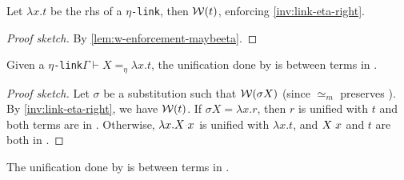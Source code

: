 \documentclass[sigconf,natbib=false,review]{acmart}
\newcommand{\appsep}{\ensuremath{\textcolor{lightgray}{\cdot}}}
\newcommand{\UnifRel}{\ensuremath{\simeq}}
\newcommand{\Ue}{\ensuremath{\UnifRel_m}\xspace}
\newcommand{\linkMacro}[1]{\ensuremath{#1}\texttt{-link}\xspace}
\newcommand{\linketa} {\linkMacro{\eta}}
\newcommand{\linketaM}[3]{\ensuremath{#1 \vdash #2 =_\eta #3}}
\newcommand{\rhs}{rhs\xspace}
\begin{document}
\begin{lemma}
  Let $\lambda x.t$ be the \rhs of a \linketa, then $\mathcal{W}(t)$, enforcing \cref{inv:link-eta-right}.
  \label{lemma:unif-eta-aux}
\end{lemma}

\begin{proof}[Proof sketch]
  By \cref{lem:w-enforcement-maybeeta}.
\end{proof}

\begin{lemma}
  Given a \linketa \linketaM{\Gamma}{X}{\lambda x.t}, the unification done by \progressetaleft is between
  terms in \wellb.
  \label{lemma:unif-eta-1}
\end{lemma}

\begin{proof}[Proof sketch]
  Let $\sigma$ be a substitution such that $\mathcal{W}(\sigma X)$ (since \Ue preserves \wellb).
  By \cref{inv:link-eta-right}, we have $\mathcal{W}(t)$.
  If $\sigma X = \lambda x.r$, then $r$ is unified with $t$ and both terms are in \wellb.
  Otherwise, $\lambda x. X\appsep x$ is unified with $\lambda x. t$, and $X\appsep x$ and $t$
  are both in \wellb.
\end{proof}



\begin{lemma}
  The unification done by \progressetadedup is between
  terms in \wellb.
  \label{lemma:unif-eta-3}
\end{lemma}
\end{document}
